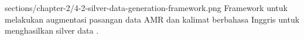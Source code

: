   {sections/chapter-2/4-2-silver-data-generation-framework.png}
  {Framework untuk melakukan augmentasi pasangan data \gls{AMR} dan kalimat berbahasa Inggris untuk menghasilkan silver data .}

